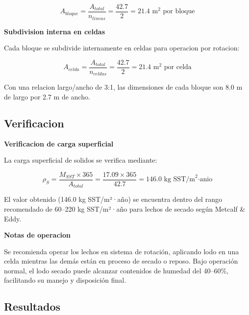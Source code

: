 \begin{equation}
A_{bloque} = \frac{A_{total}}{n_{lineas}} = \frac{42.7}{2} = 21.4 \text{ m}^2 \text{ por bloque}
\end{equation}

\textbf{Subdivision interna en celdas}

Cada bloque se subdivide internamente en celdas para operacion por rotacion:

\begin{equation}
A_{celda} = \frac{A_{total}}{n_{celdas}} = \frac{42.7}{2} = 21.4 \text{ m}^2 \text{ por celda}
\end{equation}

Con una relacion largo/ancho de 3:1, las dimensiones de cada bloque son 8.0 m de largo por 2.7 m de ancho.

\subsection{Verificacion}

\textbf{Verificacion de carga superficial}

La carga superficial de solidos se verifica mediante:

\begin{equation}
\rho_S = \frac{M_{SST} \times 365}{A_{total}} = \frac{17.09 \times 365}{42.7} = 146.0 \text{ kg SST/m}^2\text{·anio}
\end{equation}

El valor obtenido (146.0 kg SST/m²·año) se encuentra dentro del rango recomendado de 60--220 kg SST/m²·año para lechos de secado según Metcalf & Eddy.

\textbf{Notas de operacion}

Se recomienda operar los lechos en sistema de rotación, aplicando lodo en una celda mientras las demás están en proceso de secado o reposo. Bajo operación normal, el lodo secado puede alcanzar contenidos de humedad del 40--60\%, facilitando su manejo y disposición final.

\subsection{Resultados}

